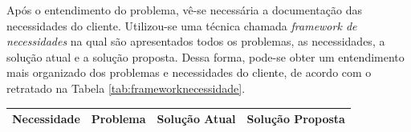 Após o entendimento do problema, vê-se necessária a documentação das necessidades do cliente. Utilizou-se uma técnica chamada \textit{framework de necessidades} na qual são apresentados todos os problemas, as necessidades, a solução atual e a solução proposta. Dessa forma, pode-se obter um entendimento mais organizado dos problemas e necessidades do cliente, de acordo com o retratado na Tabela \ref{tab:frameworknecessidade}.

\begin{table}[H]
\centering
\begin{tabular}{|p{5cm}|p{3cm}|p{3cm}|p{5cm}|}

\hline
\textbf{Necessidade} &
\textbf{Problema} &
\textbf{Solução Atual} &
\textbf{Solução Proposta}
\\ \hline


\end{tabular}
\end{table}
